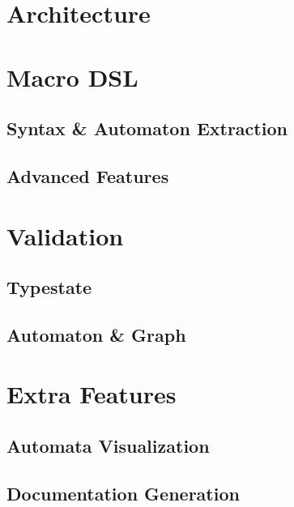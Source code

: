 \section{Architecture}\label{sec:architecture}

\section{Macro DSL}\label{sec:macro-dsl}

\subsection{Syntax \& Automaton Extraction}

\subsection{Advanced Features}




\section{Validation}\label{sec:validation}

\subsection{Typestate}\label{sec:validation:typestate}

\subsection{Automaton \& Graph}\label{sec:validation:automaton}

\section{Extra Features}\label{sec:extra-features}

\subsection{Automata Visualization}\label{sec:extra-features:automata-visualization}

\subsection{Documentation Generation}\label{sec:extra-features:documentation-generation}
